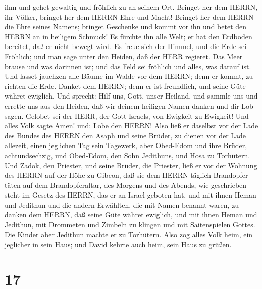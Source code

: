 ihm und gehet gewaltig und fröhlich zu an seinem Ort. 
Bringet her dem HERRN, ihr Völker, bringet her dem HERRN Ehre und Macht!
 Bringet her dem HERRN die Ehre seines Namens; bringet
Geschenke und kommt vor ihn und betet den HERRN an in heiligem Schmuck!
 Es fürchte ihn alle Welt; er hat den Erdboden bereitet,
daß er nicht bewegt wird.  Es freue sich der Himmel, und
die Erde sei Fröhlich; und man sage unter den Heiden, daß der HERR
regieret.  Das Meer brause und was darinnen ist; und das
Feld sei fröhlich und alles, was darauf ist.  Und lasset
jauchzen alle Bäume im Walde vor dem HERRN; denn er kommt, zu richten
die Erde.  Danket dem HERRN; denn er ist freundlich, und
seine Güte währet ewiglich.  Und sprecht: Hilf uns, Gott,
unser Heiland, und sammle uns und errette uns aus den Heiden, daß wir
deinem heiligen Namen danken und dir Lob sagen.  Gelobet
sei der HERR, der Gott Israels, von Ewigkeit zu Ewigkeit! Und alles Volk
sagte Amen! und: Lobe den HERRN!  Also ließ er daselbst vor
der Lade des Bundes des HERRN den Asaph und seine Brüder, zu dienen vor
der Lade allezeit, einen jeglichen Tag sein Tagewerk,  aber
Obed-Edom und ihre Brüder, achtundsechzig, und Obed-Edom, den Sohn
Jedithuns, und Hosa zu Torhütern.  Und Zadok, den Priester,
und seine Brüder, die Priester, ließ er vor der Wohnung des HERRN auf
der Höhe zu Gibeon,  daß sie dem HERRN täglich Brandopfer
täten auf dem Brandopferaltar, des Morgens und des Abends, wie
geschrieben steht im Gesetz des HERRN, das er an Israel geboten hat,
 und mit ihnen Heman und Jedithun und die andern Erwählten,
die mit Namen benannt waren, zu danken dem HERRN, daß seine Güte währet
ewiglich,  und mit ihnen Heman und Jedithun, mit Drommeten
und Zimbeln zu klingen und mit Saitenspielen Gottes. Die Kinder aber
Jedithun machte er zu Torhütern.  Also zog alles Volk heim,
ein jeglicher in sein Haus; und David kehrte auch heim, sein Haus zu
grüßen.

\hypertarget{section-16}{%
\section{17}\label{section-16}}

